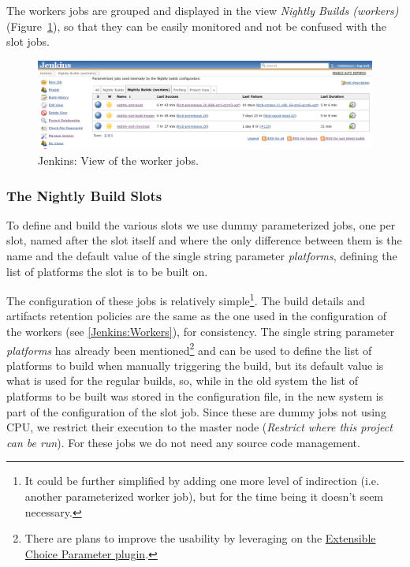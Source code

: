 \documentclass{lhcbnote}
\newcommand{\link}[2]{\href{#1}{#2}}
\begin{document}
The workers jobs are grouped and displayed in the view \emph{Nightly Builds
(workers)} (Figure~\ref{fig:jenkins-workers}), so that they can be easily
monitored and not be confused with the slot jobs.

\begin{figure}
  \begin{center}
    \includegraphics[width=15cm]{images/jenkins-2}
  \end{center}
  \caption{Jenkins: View of the worker jobs.}
  \label{fig:jenkins-workers}
\end{figure}


\subsubsection{The Nightly Build Slots}
\label{Jenkins:Slots}
To define and build the various slots we use dummy parameterized jobs, one per
slot, named after the slot itself and where the only difference between them is
the name and the default value of the single string parameter \emph{platforms},
defining the list of platforms the slot is to be built on.

The configuration of these jobs is relatively simple\footnote{It could be
further simplified by adding one more level of indirection (i.e. another
parameterized worker job), but for the time being it doesn't seem necessary.}.
The build details and artifacts retention policies are the same as the one used
in the configuration of the workers (see \ref{Jenkins:Workers}), for
consistency.  The single string parameter \emph{platforms} has already been
mentioned\footnote{There are plans to improve the usability by leveraging on the
\link{
https://wiki.jenkins-ci.org/display/JENKINS/Extensible+Choice+Parameter+plugin}{
Extensible Choice Parameter plugin}.} and can be used to define the list of
platforms to build when manually triggering the build, but its default value is
what is used for the regular builds, so, while in the old system the list of
platforms to be built was stored in the configuration file, in the new system is
part of the configuration of the slot job.  Since these are dummy jobs not using
CPU, we
restrict their execution to the master node (\emph{Restrict where this project
can be run}).  For these jobs we do not need any source code management.
\end{document}
